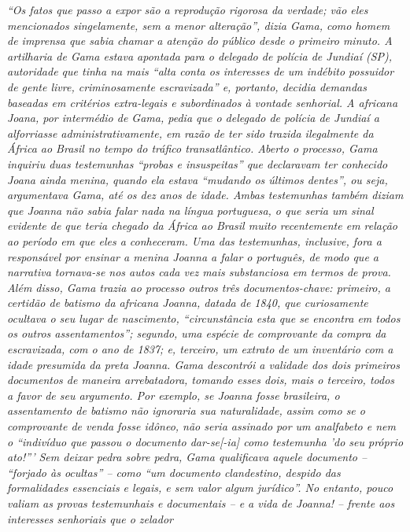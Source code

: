 {\begin{didascalia}
\emph{``Os fatos que passo a expor são a reprodução rigorosa da verdade;
vão eles mencionados singelamente, sem a menor alteração'', dizia Gama,
como homem de imprensa que sabia chamar a atenção do público desde o
primeiro minuto. A artilharia de Gama estava apontada para o delegado de
polícia de Jundiaí (SP), autoridade que tinha na mais ``alta conta os
interesses de um indébito possuidor de gente livre, criminosamente
escravizada'' e, portanto, decidia demandas baseadas em critérios
extra-legais e subordinados à vontade senhorial. A africana Joana, por
intermédio de Gama, pedia que o delegado de polícia de Jundiaí a
alforriasse administrativamente, em razão de ter sido trazida
ilegalmente da África ao Brasil no tempo do tráfico transatlântico.
Aberto o processo, Gama inquiriu duas testemunhas ``probas e insuspeitas''
que declaravam ter conhecido Joana ainda menina, quando ela estava
``mudando os últimos dentes'', ou seja, argumentava Gama, até os dez anos
de idade. Ambas testemunhas também diziam que Joanna não sabia falar
nada na língua portuguesa, o que seria um sinal evidente de que teria
chegado da África ao Brasil muito recentemente em relação ao período em
que eles a conheceram. Uma das testemunhas, inclusive, fora a
responsável por ensinar a menina Joanna a falar o português, de modo que
a narrativa tornava-se nos autos cada vez mais substanciosa em termos de
prova. Além disso, Gama trazia ao processo outros três documentos-chave:
primeiro, a certidão de batismo da africana Joanna, datada de 1840, que
curiosamente ocultava o seu lugar de nascimento, ``circunstância esta que
se encontra em todos os outros assentamentos''; segundo, uma espécie de
comprovante da compra da escravizada, com o ano de 1837; e, terceiro, um
extrato de um inventário com a idade presumida da preta Joanna. Gama
descontrói a validade dos dois primeiros documentos de maneira
arrebatadora, tomando esses dois, mais o terceiro, todos a favor de seu
argumento. Por exemplo, se Joanna fosse brasileira, o assentamento de
batismo não ignoraria sua naturalidade, assim como se o comprovante de
venda fosse idôneo, não seria assinado por um analfabeto e nem o
``indivíduo que passou o documento dar-se{[}-ia{]} como testemunha 'do
seu próprio ato!''' Sem deixar pedra sobre pedra, Gama qualificava aquele
documento -- ``forjado às ocultas'' -- como ``um documento clandestino,
despido das formalidades essenciais e legais, e sem valor algum
jurídico''. No entanto, pouco valiam as provas testemunhais e documentais
-- e a vida de Joanna! -- frente aos interesses senhoriais que o zelador
}
\end{didascalia}}
